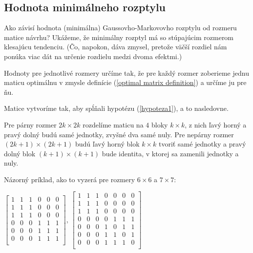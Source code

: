 \subsection{Hodnota minimálneho rozptylu}

Ako závisí hodnota (minimálna) Gaussovho-Markovovho rozptylu od rozmeru matice návrhu? 
Ukážeme, že minimálny rozptyl má so stúpajúcim rozmerom klesajúcu tendenciu. 
(Čo, napokon, dáva zmysel, pretože väčší rozdiel nám ponúka viac dát na určenie rozdielu medzi dvoma efektmi.)

Hodnoty pre jednotlivé rozmery určíme tak, že pre každý rozmer zoberieme jednu maticu optimálnu 
v zmysle definície (\ref{optimal matrix definition}) a určíme ju pre ňu.

Matice vytvoríme tak, aby spĺňali hypotézu (\ref{hypoteza1}), a to nasledovne.

Pre párny rozmer $2k \times 2k$ rozdelíme maticu na $4$ bloky $k \times k$, 
z nich ľavý horný a pravý dolný budú samé jednotky, zvyšné dva samé nuly. 
Pre nepárny rozmer $(2k + 1) \times (2k + 1)$ budú ľavý horný blok $k \times k$ tvoriť samé jednotky 
a pravý dolný blok $(k + 1) \times (k + 1)$ bude identita, v ktorej sa zamenili jednotky a nuly.

Názorný príklad, ako to vyzerá pre rozmery $6 \times 6$ a $7 \times 7$:

\begin{center}
$
\begin{bmatrix}
1 & 1 & 1 & 0 & 0 & 0 \\
1 & 1 & 1 & 0 & 0 & 0 \\
1 & 1 & 1 & 0 & 0 & 0 \\
0 & 0 & 0 & 1 & 1 & 1 \\
0 & 0 & 0 & 1 & 1 & 1 \\
0 & 0 & 0 & 1 & 1 & 1 \\
\end{bmatrix}
$,
$
\begin{bmatrix}
1 & 1 & 1 & 0 & 0 & 0 & 0 \\
1 & 1 & 1 & 0 & 0 & 0 & 0 \\
1 & 1 & 1 & 0 & 0 & 0 & 0 \\
0 & 0 & 0 & 0 & 1 & 1 & 1 \\
0 & 0 & 0 & 1 & 0 & 1 & 1 \\
0 & 0 & 0 & 1 & 1 & 0 & 1 \\
0 & 0 & 0 & 1 & 1 & 1 & 0 \\
\end{bmatrix}
$
\end{center}

